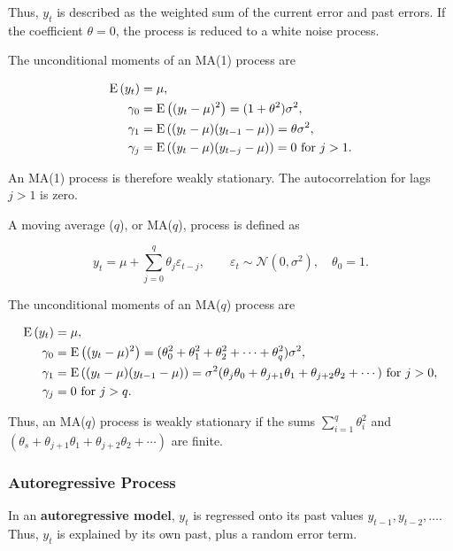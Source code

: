 Thus, $y_t$ is described as the weighted sum of the current error and past errors. If the coefficient $\theta = 0$, the process is reduced to a white noise process. 

The unconditional moments of an MA(1) process are

\begin{align*}
	\mathrm{E}\left({y_t}\right) &= \mu, \\
	\gamma_0 &= \mathrm{E}\left({(y_t-\mu)^2}\right) = (1+\theta^2)\sigma^2, \\
	\gamma_1 &= \mathrm{E}\left({(y_t-\mu)(y_{t-1}-\mu)}\right) = \theta\sigma^2, \\
	\gamma_j &= \mathrm{E}\left({(y_t-\mu)(y_{t-j}-\mu)}\right) = 0 \text{ for } j > 1.
\end{align*}

An MA(1) process is therefore weakly stationary. The autocorrelation for lags $j>1$ is zero.

A moving average ($q$), or MA($q$), process is defined as

\begin{equation}
  y_t = \mu + \sum^q_{j=0}\theta_j\varepsilon_{t-j}, \qquad \varepsilon_t \sim \mathcal{N}(0,\sigma^2), \quad \theta_0 = 1.
\end{equation}

The unconditional moments of an MA($q$) process are

\begin{align*}
	\mathrm{E}\left({y_t}\right) &= \mu, \\
	\gamma_0 &= \mathrm{E}\left({(y_t-\mu)^2}\right) = (\theta_0^2 + \theta_1^2 + \theta_2^2 + \dots + \theta_q^2)\sigma^2, \\
	\gamma_1 &= \mathrm{E}\left({(y_t-\mu)(y_{t-1}-\mu)}\right) = \sigma^2(\theta_j\theta_0 + \theta_{j+1}\theta_1 + \theta_{j+2}\theta_2 + \cdots) \text{ for } j > 0, \\
	\gamma_j &= 0 \text{ for } j > q.
\end{align*}

Thus, an MA($q$) process is weakly stationary if the sums $\sum^q_{i=1}\theta_i^2$ and $(\theta_s + \theta_{j+1}\theta_1 + \theta_{j+2}\theta_2 + \cdots)$ are finite.

\subsubsection{Autoregressive Process}

In an \textbf{autoregressive model}, $y_t$ is regressed onto its past values $y_{t-1},y_{t-2},\dots$. Thus, $y_t$ is explained by its own past, plus a random error term. 

